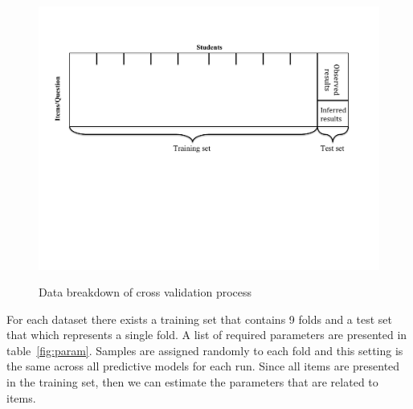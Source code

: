 \begin{figure}
\centering
{\includegraphics[trim=2cm 9cm 2.4cm 2.4cm,clip=true,width=.6\textwidth]{Images/Methodology.pdf}}
\caption{Data breakdown of cross validation process}
\label{figMethod}
\end{figure}

For each dataset there exists a training set that contains 9 folds and a test set that which represents a single fold. A list of required parameters are presented in table~\ref{fig:param}. Samples are assigned randomly to each fold and this setting is the same across all predictive models for each run. Since all items are presented in the training set, then we can estimate the parameters that are related to items. 

